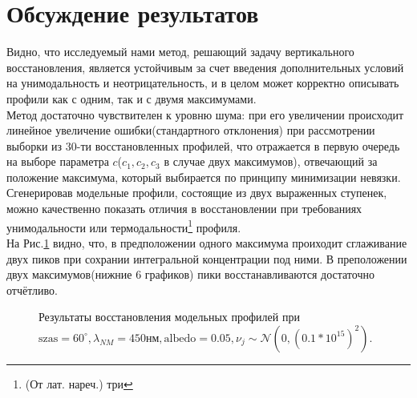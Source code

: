 \documentclass[a4paper,14pt]{article}
\theoremstyle{plain}
\theoremstyle{definition}
\theoremstyle{remark}
\newcommand{\nl}{\\ \indent}
\begin{document}
\section{Обсуждение результатов}
Видно, что исследуемый нами метод, решающий задачу вертикального
восстановления, является устойчивым за счет введения
дополнительных условий на унимодальность и неотрицательность,
и в целом может корректно описывать профили как с одним, так
и с двумя максимумами.
\nl
Метод достаточно чувствителен к уровню шума:
при его увеличении происходит линейное увеличение
ошибки(стандартного отклонения) при рассмотрении выборки из 
$30$-ти восстановленных профилей, 
что отражается в первую очередь на выборе параметра 
$c$($c_1, c_2, c_3$ в случае двух максимумов), 
отвечающий за положение максимума,
который выбирается по принципу минимизации невязки.
\nl
Сгенерировав модельные профили, состоящие из двух 
выраженных ступенек, можно качественно показать отличия
в восстановлении при требованиях унимодальности или 
термодальности\footnote{(От лат. нареч.) три} профиля.
\nl
На Рис.\ref{pic:threemode_12} видно, 
что, в предположении одного максимума проиходит сглаживание 
двух пиков при сохрании интегральной концентрации под ними.
В преположении двух максимумов(нижние $6$ графиков) 
пики восстанавливаются достаточно отчётливо. 
\begin{figure}[bh]
\noindent{}
\caption{Результаты восстановления модельных профилей при
$\text{szas}=60^{\circ}, \lambda_{NM}= 450\text{нм},
\text{albedo}=0.05, \nu_j \sim 
\mathcal{N}(0, (0.1 * 10^{15})^2)$.}
\label{pic:threemode_12}
\end{figure} 
\clearpage 
\end{document}
